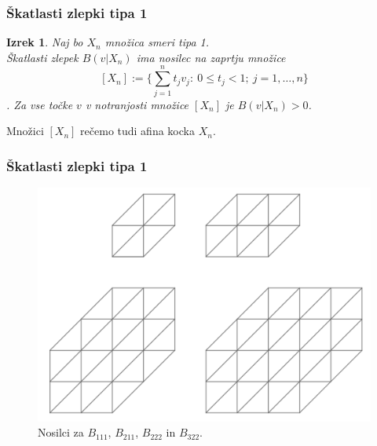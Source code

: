 \documentclass{beamer}
\newtheorem{izrek}{Izrek}
\begin{document}

\begin{frame}
\frametitle{Škatlasti zlepki tipa 1}

\begin{izrek}
Naj bo $X_n$ množica smeri tipa 1.\\
Škatlasti zlepek $B(v|X_n)$ ima nosilec na zaprtju množice
$$[X_n] := \{ \sum_{j=1}^n t_j v_j : \ 0 \leq t_j < 1; \ j = 1, \ldots, n\}$$.
Za vse točke $v$ v notranjosti množice $[X_n]$ je $B(v|X_n) > 0$.
\end{izrek}

\vspace{5mm}

Množici $[X_n]$ rečemo tudi afina kocka $X_n$.
\end{frame}


\begin{frame}
\frametitle{Škatlasti zlepki tipa 1}

\begin{figure}
    \centering
    \includegraphics[scale=0.32]{nosilci}
    \caption{Nosilci za $B_{111}$, $B_{211}$, $B_{222}$ in $B_{322}$.}
\end{figure}

\end{frame}

\end{document}
